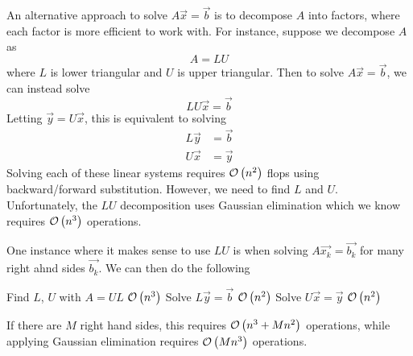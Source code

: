 An alternative approach to solve $A\Vec{x}=\Vec{b}$ is to decompose $A$ into factors, 
where each factor is more efficient to work with.  
For instance, suppose we decompose $A$ as
%
\begin{equation*}
A=LU
\end{equation*}
%
where $L$ is lower triangular and $U$ is upper triangular.
Then to solve $A\Vec{x}=\Vec{b}$, we can instead solve
%
\begin{equation*}
LU\Vec{x}=\Vec{b}
\end{equation*}
%
Letting $\Vec{y}=U\Vec{x}$, this is equivalent to solving
%
\begin{align*}
  L\Vec{y}&=\Vec{b}\\
  U\Vec{x}&=\Vec{y}
\end{align*}
%
Solving each of these linear systems requires $\mathcal{O}\left(n^2\right)$ flops using
backward/forward substitution. However, we need to find $L$ and $U$.
Unfortunately, the $LU$ decomposition uses Gaussian elimination which we know
requires $\mathcal{O}\left(n^3\right)$ operations.

One instance where it makes sense to use $LU$ is when solving
$A\Vec{x_k}=\Vec{b_k}$ for many right ahnd sides $\Vec{b_k}$. We can then do the
following
%
\begin{algorithm}
    \begin{algorithmic} 
      \STATE Find $L$, $U$ with $A=UL$ \hspace{1 cm} \textcolor{red}{$\mathcal{O}\left(n^3\right)$}
        \STATE Solve $L\Vec{y}=\Vec{b}$ \hspace{1 cm} \textcolor{red}{$\mathcal{O}\left(n^2\right)$}
        \STATE Solve $U\Vec{x}=\Vec{y}$ \hspace{1 cm} \textcolor{red}{$\mathcal{O}\left(n^2\right)$}
      \ENDFOR
    \end{algorithmic} 
\end{algorithm}
%
If there are $M$ right hand sides, this requires $\mathcal{O}\left(n^3+Mn^2\right)$ operations, 
while applying Gaussian elimination requires $\mathcal{O}\left(Mn^3\right)$ operations.  

